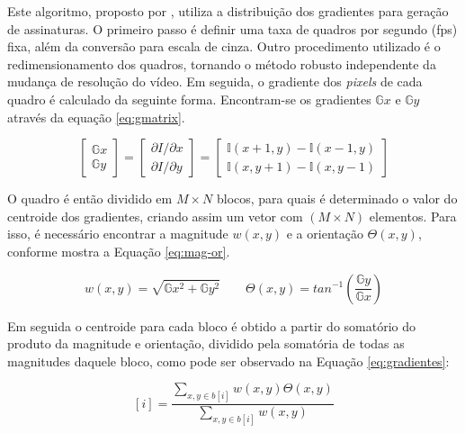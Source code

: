 	Este algoritmo, proposto por \cite{lee2008robust}, utiliza a distribuição dos gradientes para geração de assinaturas. O primeiro passo é definir uma taxa de quadros por segundo (fps) fixa, além da conversão para escala de cinza. Outro procedimento utilizado é o redimensionamento dos quadros, tornando o  método robusto independente da mudança de resolução do vídeo. Em seguida, o gradiente dos \textit{pixels} de cada quadro é calculado da seguinte forma. Encontram-se os gradientes $\mathbb{G}x$ e $\mathbb{G}y$ através da equação \ref{eq:gmatrix}.

\begin{equation}
  \label{eq:gmatrix}
  \begin{bmatrix}
    \mathbb{G}x
    \\ 
    \mathbb{G}y
  \end{bmatrix}= 
  \begin{bmatrix}
    \partial I/\partial x
    \\ 
    \partial I/\partial y
  \end{bmatrix}=
  \begin{bmatrix}
    \mathbb{I}(x+1, y) - \mathbb{I}(x-1,y)
    \\ 
    \mathbb{I}(x, y+1) - \mathbb{I}(x,y-1)
  \end{bmatrix}
\end{equation}
    
	O quadro é então dividido em $M\times N$ blocos, para quais é determinado o valor do centroide dos gradientes, criando assim um vetor com $(M \times N)$ elementos. Para isso, é necessário encontrar a magnitude \textit{$w(x,y)$} e a orientação \textit{$\Theta(x,y)$}, conforme mostra a Equação \ref{eq:mag-or}.
    
\begin{equation}
	\label{eq:mag-or}
    w(x,y) = \sqrt{\mathbb{G}x^{2} + \mathbb{G}y^{2}}
\qquad
\Theta(x,y) = tan^{-1}\left (\frac{\mathbb{G}y}{\mathbb{G}x} \right)
\end{equation}
    
    Em seguida o centroide para cada bloco é obtido a partir do somatório do produto da magnitude e orientação, dividido pela somatória de todas as magnitudes daquele bloco, como pode ser observado na Equação \ref{eq:gradientes}:
    
\begin{equation}
	\label{eq:gradientes}
	[i] = \frac{\sum_{x,y \in b[i]} w(x,y)\Theta (x,y)}{\sum_{x,y \in b[i]} w(x,y)}
\end{equation}
    

